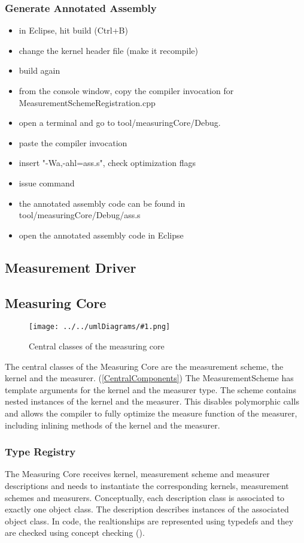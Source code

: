 \documentclass[a4paper,12pt]{article}
\newcommand{\umlDiagram}[1]{\begin{center}\texttt{[image: ../../umlDiagrams/\#1.png]}\end{center}}
\newcommand{\umlFloat}[2]{
\begin{figure}[tbh]
\umlDiagram{#1}
\caption{#2}
\label{#1}
\end{figure}
}
\newcommand{\umlRef}[1]{\autoref{#1}}
\begin{document}
\subsubsection{Generate Annotated Assembly}
\begin{itemize}
\item in Eclipse, hit build (Ctrl+B)
\item change the kernel header file (make it recompile)
\item build again
\item from the console window, copy the compiler invocation for MeasurementSchemeRegistration.cpp
\item open a terminal and go to tool/measuringCore/Debug.
\item paste the compiler invocation
\item insert "-Wa,-ahl=ass.s", check optimization flags
\item issue command
\item the annotated assembly code can be found in tool/measuringCore/Debug/ass.s
\item open the annotated assembly code in Eclipse
\end{itemize}
\subsection{Measurement Driver}

\subsection{Measuring Core}
\umlFloat{CentralClasses}{Central classes of the measuring core}
The central classes of the Measuring Core are the measurement scheme, the kernel and the measurer. (\umlRef{CentralComponents}) The MeasurementScheme has template arguments for the kernel and the measurer type. The scheme contains nested instances of the kernel and the measurer. This disables polymorphic calls and allows the compiler to fully optimize the measure function of the measurer, including inlining methods of the kernel and the measurer.

\subsubsection{Type Registry}
The Measuring Core receives kernel, measurement scheme and measurer descriptions and needs to instantiate the corresponding kernels, measurement schemes and measurers. Conceptually, each description class is associated to exactly one object class. The description describes instances of the associated object class. In code, the realtionships are represented using typedefs and they are checked using concept checking (\cite{siek01_concept_check}).
\end{document}
